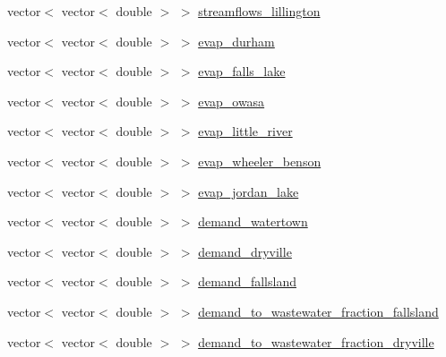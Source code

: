 \begin{DoxyCompactItemize}
vector$<$ vector$<$ double $>$ $>$ \mbox{\hyperlink{classPaperTestProblem_a77aa63c91de59ca1445239a9ce7424df_a77aa63c91de59ca1445239a9ce7424df}{streamflows\+\_\+lillington}}
\item 
vector$<$ vector$<$ double $>$ $>$ \mbox{\hyperlink{classPaperTestProblem_aafd6edcc514c3b365c18fb3357f7d58a_aafd6edcc514c3b365c18fb3357f7d58a}{evap\+\_\+durham}}
\item 
vector$<$ vector$<$ double $>$ $>$ \mbox{\hyperlink{classPaperTestProblem_a6ff2293ecad9cc169484376cd419c166_a6ff2293ecad9cc169484376cd419c166}{evap\+\_\+falls\+\_\+lake}}
\item 
vector$<$ vector$<$ double $>$ $>$ \mbox{\hyperlink{classPaperTestProblem_a9feb0214e7f4840bf9ddd81d50473496_a9feb0214e7f4840bf9ddd81d50473496}{evap\+\_\+owasa}}
\item 
vector$<$ vector$<$ double $>$ $>$ \mbox{\hyperlink{classPaperTestProblem_a546f7d60630162c03a980b233195bfbe_a546f7d60630162c03a980b233195bfbe}{evap\+\_\+little\+\_\+river}}
\item 
vector$<$ vector$<$ double $>$ $>$ \mbox{\hyperlink{classPaperTestProblem_a5e4e84230783614660cf17719a723eb0_a5e4e84230783614660cf17719a723eb0}{evap\+\_\+wheeler\+\_\+benson}}
\item 
vector$<$ vector$<$ double $>$ $>$ \mbox{\hyperlink{classPaperTestProblem_aed8a373010157bf691b3a7177288acdd_aed8a373010157bf691b3a7177288acdd}{evap\+\_\+jordan\+\_\+lake}}
\item 
vector$<$ vector$<$ double $>$ $>$ \mbox{\hyperlink{classPaperTestProblem_a79efa6cbc7f2bd003f70419fe6d45efd_a79efa6cbc7f2bd003f70419fe6d45efd}{demand\+\_\+watertown}}
\item 
vector$<$ vector$<$ double $>$ $>$ \mbox{\hyperlink{classPaperTestProblem_a74c88139d65ef34aec2aa2111697c7be_a74c88139d65ef34aec2aa2111697c7be}{demand\+\_\+dryville}}
\item 
vector$<$ vector$<$ double $>$ $>$ \mbox{\hyperlink{classPaperTestProblem_acd6b67e6c12e3ef1ff2278f312888f4e_acd6b67e6c12e3ef1ff2278f312888f4e}{demand\+\_\+fallsland}}
\item 
vector$<$ vector$<$ double $>$ $>$ \mbox{\hyperlink{classPaperTestProblem_a37afd20e40b7e6f26d229bc79221ea97_a37afd20e40b7e6f26d229bc79221ea97}{demand\+\_\+to\+\_\+wastewater\+\_\+fraction\+\_\+fallsland}}
\item 
vector$<$ vector$<$ double $>$ $>$ \mbox{\hyperlink{classPaperTestProblem_a6641660439d10f0476f39ee28967edb5_a6641660439d10f0476f39ee28967edb5}{demand\+\_\+to\+\_\+wastewater\+\_\+fraction\+\_\+dryville}}

\end{DoxyCompactItemize}
